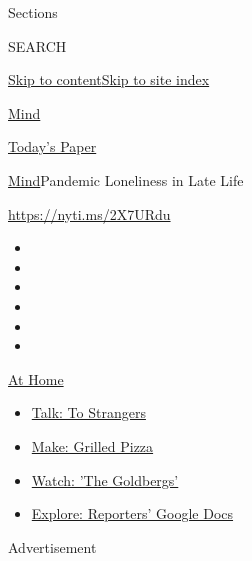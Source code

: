 Sections

SEARCH

\protect\hyperlink{site-content}{Skip to
content}\protect\hyperlink{site-index}{Skip to site index}

\href{https://www.nytimes.com/section/well/mind}{Mind}

\href{https://myaccount.nytimes.com/auth/login?response_type=cookie\&client_id=vi}{}

\href{https://www.nytimes.com/section/todayspaper}{Today's Paper}

\href{/section/well/mind}{Mind}\textbar{}Pandemic Loneliness in Late
Life

\url{https://nyti.ms/2X7URdu}

\begin{itemize}
\item
\item
\item
\item
\item
\item
\end{itemize}

\href{https://www.nytimes.com/spotlight/at-home?action=click\&pgtype=Article\&state=default\&region=TOP_BANNER\&context=at_home_menu}{At
Home}

\begin{itemize}
\tightlist
\item
  \href{https://www.nytimes.com/2020/08/03/well/family/the-benefits-of-talking-to-strangers.html?action=click\&pgtype=Article\&state=default\&region=TOP_BANNER\&context=at_home_menu}{Talk:
  To Strangers}
\item
  \href{https://www.nytimes.com/2020/08/01/at-home/coronavirus-make-pizza-on-a-grill.html?action=click\&pgtype=Article\&state=default\&region=TOP_BANNER\&context=at_home_menu}{Make:
  Grilled Pizza}
\item
  \href{https://www.nytimes.com/2020/07/31/arts/television/goldbergs-abc-stream.html?action=click\&pgtype=Article\&state=default\&region=TOP_BANNER\&context=at_home_menu}{Watch:
  'The Goldbergs'}
\item
  \href{https://www.nytimes.com/interactive/2020/at-home/even-more-reporters-editors-diaries-lists-recommendations.html?action=click\&pgtype=Article\&state=default\&region=TOP_BANNER\&context=at_home_menu}{Explore:
  Reporters' Google Docs}
\end{itemize}

Advertisement

